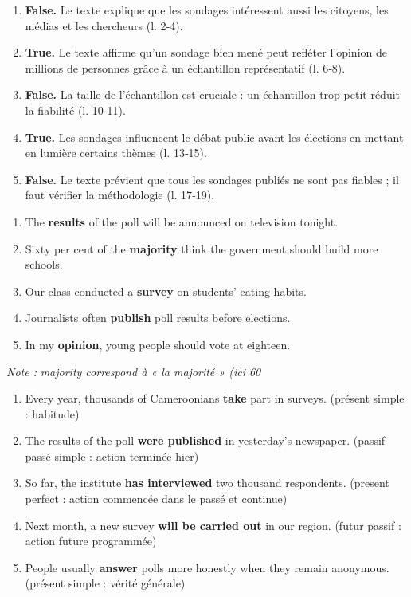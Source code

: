 \documentclass[11pt]{article}
\newcommand{\eng}[1]{\ifmmode\text{\textit{#1}}\else\begingroup\selectlanguage{english}\itshape #1\endgroup\fi}
\begin{document}
\begin{corrige}
\begin{enumerate}
\item \textbf{False.} Le texte explique que les sondages intéressent aussi les citoyens, les médias et les chercheurs (l. 2‑4).
\item \textbf{True.} Le texte affirme qu'un sondage bien mené peut refléter l'opinion de millions de personnes grâce à un échantillon représentatif (l. 6‑8).
\item \textbf{False.} La taille de l'échantillon est cruciale : un échantillon trop petit réduit la fiabilité (l. 10‑11).
\item \textbf{True.} Les sondages influencent le débat public avant les élections en mettant en lumière certains thèmes (l. 13‑15).
\item \textbf{False.} Le texte prévient que tous les sondages publiés ne sont pas fiables ; il faut vérifier la méthodologie (l. 17‑19).
\end{enumerate}
\end{corrige}

\begin{corrige}
\begin{enumerate}
\item The \textbf{results} of the poll will be announced on television tonight.
\item Sixty per cent of the \textbf{majority} think the government should build more schools. 
\item Our class conducted a \textbf{survey} on students' eating habits.
\item Journalists often \textbf{publish} poll results before elections.
\item In my \textbf{opinion}, young people should vote at eighteen.
\end{enumerate}
\emph{Note :} \eng{majority} correspond à « la majorité » (ici 60 %
\end{corrige}

\begin{corrige}
\begin{enumerate}
\item Every year, thousands of Cameroonians \textbf{take} part in surveys. (présent simple : habitude)
\item The results of the poll \textbf{were published} in yesterday's newspaper. (passif passé simple : action terminée hier)
\item So far, the institute \textbf{has interviewed} two thousand respondents. (present perfect : action commencée dans le passé et continue)
\item Next month, a new survey \textbf{will be carried out} in our region. (futur passif : action future programmée)
\item People usually \textbf{answer} polls more honestly when they remain anonymous. (présent simple : vérité générale)
\end{enumerate}
\end{corrige}
\end{document}
